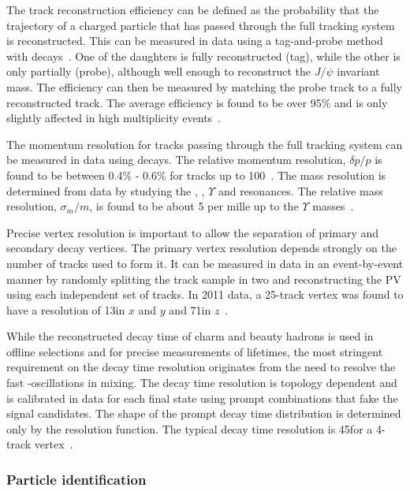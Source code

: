 The track reconstruction efficiency can be defined as the probability that the trajectory of a charged particle that has passed through the full tracking system is reconstructed. This can be measured in data using a tag-and-probe method with \decay{\jpsi}{\mumu} decays~\cite{LHCb-DP-2013-002}. One of the daughters is fully reconstructed (tag), while the other is only partially (probe), although well enough to reconstruct the $J/\psi$ invariant mass.  The efficiency can then be measured by matching the probe track to a fully reconstructed track. The average efficiency is found to be over 95\% and is only slightly affected in high multiplicity events~\cite{LHCb-DP-2013-002}.

The momentum resolution for tracks passing through the full tracking system can be measured in data using \decay{\jpsi}{\mumu} decays. The relative momentum resolution, $\delta p/p$ is found to be between 0.4\% - 0.6\% for tracks up to 100\gevc~\cite{LHCb-DP-2014-002}. The mass resolution is determined from data by studying the \jpsi, \psitwos, $\Upsilon$ and \Z resonances. The relative mass resolution, $\sigma_{m}/m$, is found to be about 5 per mille up to the $\Upsilon$ masses~\cite{LHCb-DP-2014-002}.

Precise vertex resolution is important to allow the separation of primary and secondary decay vertices. The primary vertex resolution depends strongly on the number of tracks used to form it. It can be measured in data in an event-by-event manner by randomly splitting the track sample in two and reconstructing the PV using each independent set of tracks. In 2011 data, a 25-track vertex was found to have a resolution of 13\mum in $x$ and $y$ and 71\mum in $z$~\cite{LHCb-DP-2014-002}.
 
While the reconstructed decay time of charm and beauty hadrons is used in offline selections and for precise measurements of lifetimes, the most stringent requirement on the decay time resolution originates from the need to resolve the fast \Bs-\Bsb oscillations in mixing. The decay time resolution is topology dependent and is calibrated in data for each final state using prompt combinations that fake the signal candidates. The shape of the prompt decay time distribution is determined only by the resolution function. The typical decay time resolution is 45\fs for a 4-track vertex~\cite{LHCb-DP-2014-002}.

\subsubsection{Particle identification}
\label{sec:lhcb:pid}

